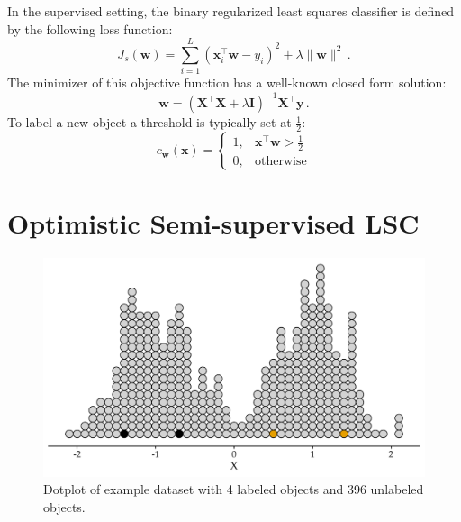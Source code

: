 \documentclass[twoside]{memoir}\usepackage[]{graphicx}\usepackage{xcolor}
\makeatletter
\def\maxwidth{ %
  \ifdim\Gin@nat@width>\linewidth
    \linewidth
  \else
    \Gin@nat@width
  \fi
}
\newenvironment{knitrout}{}{} %
\makeatother
\begin{document}
In the supervised setting, the binary regularized least squares classifier is defined by the following loss function:
\begin{equation}
J_s(\mathbf{w}) = \sum_{i=1}^L (\mathbf{x}_i^\top \mathbf{w}-y_i)^2 + \lambda \|\mathbf{w} \|^2 \,. \label{eq:supervisedobjective}
\end{equation}
The minimizer of this objective function has a well-known closed form solution:
\begin{equation}
\mathbf{w} = \left( \mathbf{X}^\top \mathbf{X}  + \lambda \mathbf{I} \right)^{-1} \mathbf{X}^\top \mathbf{y} \,. \label{eq:olssolution}
\end{equation}
To label a new object a threshold is typically set at $\tfrac{1}{2}$:
$$
c_\mathbf{w}(\mathbf{x}) = 
\begin{cases}
    1, & \mathbf{x}^\top \mathbf{w}>\tfrac{1}{2}\\
    0,              & \text{otherwise}
\end{cases}
$$

\section{Optimistic Semi-supervised LSC}

\begin{knitrout}
\color{fgcolor}\begin{figure}
\includegraphics[width=\maxwidth]{figure/attractionexample-1} \caption[Dotplot of example dataset with 4 labeled objects and 396 unlabeled objects]{Dotplot of example dataset with 4 labeled objects and 396 unlabeled objects.}\label{fig:attractionexample}
\end{figure}


\end{knitrout}
\end{document}
